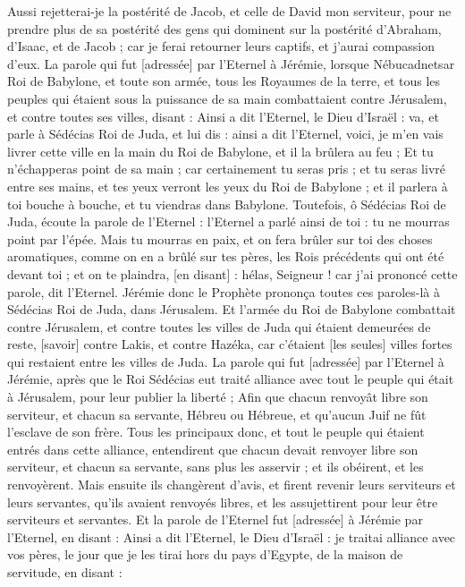 \begin{multicols}{2}
Aussi rejetterai-je la postérité de Jacob, et celle de David mon serviteur, pour ne prendre plus de sa postérité des gens qui dominent sur la postérité d'Abraham, d'Isaac, et de Jacob ; car je ferai retourner leurs captifs, et j'aurai compassion d'eux.
\VerseOne{}La parole qui fut [adressée] par l'Eternel à Jérémie, lorsque Nébucadnetsar Roi de Babylone, et toute son armée, tous les Royaumes de la terre, et tous les peuples qui étaient sous la puissance de sa main combattaient contre Jérusalem, et contre toutes ses villes, disant :
Ainsi a dit l'Eternel, le Dieu d'Israël : va, et parle à Sédécias Roi de Juda, et lui dis : ainsi a dit l'Eternel, voici, je m'en vais livrer cette ville en la main du Roi de Babylone, et il la brûlera au feu ;
Et tu n'échapperas point de sa main ; car certainement tu seras pris ; et tu seras livré entre ses mains, et tes yeux verront les yeux du Roi de Babylone ; et il parlera à toi bouche à bouche, et tu viendras dans Babylone.
Toutefois, ô Sédécias Roi de Juda, écoute la parole de l'Eternel : l'Eternel a parlé ainsi de toi : tu ne mourras point par l'épée.
Mais tu mourras en paix, et on fera brûler sur toi des choses aromatiques, comme on en a brûlé sur tes pères, les Rois précédents qui ont été devant toi ; et on te plaindra, [en disant] : hélas, Seigneur ! car j'ai prononcé cette parole, dit l'Eternel.
Jérémie donc le Prophète prononça toutes ces paroles-là à Sédécias Roi de Juda, dans Jérusalem.
Et l'armée du Roi de Babylone combattait contre Jérusalem, et contre toutes les villes de Juda qui étaient demeurées de reste, [savoir] contre Lakis, et contre Hazéka, car c'étaient [les seules] villes fortes qui restaient entre les villes de Juda.
La parole qui fut [adressée] par l'Eternel à Jérémie, après que le Roi Sédécias eut traité alliance avec tout le peuple qui était à Jérusalem, pour leur publier la liberté ;
Afin que chacun renvoyât libre son serviteur, et chacun sa servante, Hébreu ou Hébreue, et qu'aucun Juif ne fût l'esclave de son frère.
Tous les principaux donc, et tout le peuple qui étaient entrés dans cette alliance, entendirent que chacun devait renvoyer libre son serviteur, et chacun sa servante, sans plus les asservir ; et ils obéirent, et les renvoyèrent.
Mais ensuite ils changèrent d'avis, et firent revenir leurs serviteurs et leurs servantes, qu'ils avaient renvoyés libres, et les assujettirent pour leur être serviteurs et servantes.
Et la parole de l'Eternel fut [adressée] à Jérémie par l'Eternel, en disant :
Ainsi a dit l'Eternel, le Dieu d'Israël : je traitai alliance avec vos pères, le jour que je les tirai hors du pays d'Egypte, de la maison de servitude, en disant :

\end{multicols}
